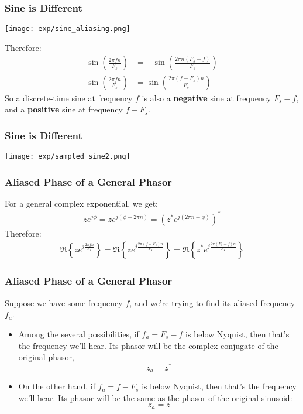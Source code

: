 \documentclass{beamer}
\begin{document}
\begin{frame}
  \frametitle{Sine is Different}
  \centerline{\texttt{[image: exp/sine\_aliasing.png]}}
  Therefore:
  \begin{align*}
    \sin\left(\frac{2\pi fn}{F_s}\right) &= -\sin\left(\frac{2\pi n(F_s-f)}{F_s}\right)\\
    \sin\left(\frac{2\pi fn}{F_s}\right) &= \sin\left(\frac{2\pi (f-F_s)n}{F_s}\right)
  \end{align*}
  So a discrete-time sine at frequency $f$ is also a {\bf negative} sine at
  frequency $F_s-f$, and a {\bf positive} sine at frequency $f-F_s$.
\end{frame}

\begin{frame}
  \frametitle{Sine is Different}
  \centerline{\texttt{[image: exp/sampled\_sine2.png]}}
\end{frame}


\begin{frame}
  \frametitle{Aliased Phase of a General Phasor}

  For a general complex exponential, we get:
  \begin{align*}
    ze^{j\phi} = ze^{j(\phi-2\pi n)} = \left(z^* e^{j(2\pi n-\phi)}\right)^*
  \end{align*}
  Therefore:
  \begin{align*}
    \Re\left\{z e^{j\frac{2\pi fn}{F_s}} \right\} =
    \Re\left\{z e^{j\frac{2\pi (f-F_s)n}{F_s}} \right\} =
    \Re\left\{z^* e^{j\frac{2\pi (F_s-f)n}{F_s}} \right\}
  \end{align*}
\end{frame}


\begin{frame}
  \frametitle{Aliased Phase of a General Phasor}

  Suppose we have some frequency $f$, and we're trying to find its
  aliased frequency $f_a$.
  \begin{itemize}
  \item Among the several possibilities, if $f_a=F_s-f$ is below
    Nyquist, then that's the frequency we'll hear.  Its phasor will be
    the complex conjugate of the original phasor,
    \[
    z_a = z^*
    \]
  \item On the other hand, if $f_a=f-F_s$ is below Nyquist, then
    that's the frequency we'll hear.  Its phasor will be the same as
    the phasor of the original sinusoid:
    \[
    z_a = z
    \]    
  \end{itemize}
  
\end{frame}
\end{document}
